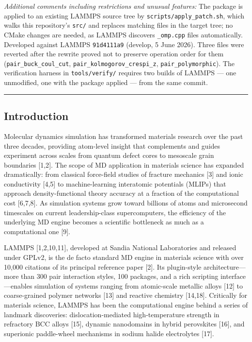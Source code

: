 \documentclass[
  11pt,
]{article}
\begin{document}
\emph{Additional comments including restrictions and unusual features:}
The package is applied to an existing LAMMPS source tree by
\texttt{scripts/apply\_patch.sh}, which walks this repository's
\texttt{src/} and replaces matching files in the target tree; no CMake
changes are needed, as LAMMPS discovers \texttt{\_omp.cpp} files
automatically. Developed against LAMMPS \texttt{91d4111a9} (develop, 5
June 2026). Three files were reverted after the rewrite proved not to
preserve operation order for them (\texttt{pair\_buck\_coul\_cut},
\texttt{pair\_kolmogorov\_crespi\_z}, \texttt{pair\_polymorphic}). The
verification harness in \texttt{tools/verify/} requires two builds of
LAMMPS --- one unmodified, one with the package applied --- from the
same commit.

\begin{center}\rule{0.5\linewidth}{0.5pt}\end{center}

\subsection{Introduction}\label{introduction}

Molecular dynamics simulation has transformed materials research over
the past three decades, providing atom-level insight that complements
and guides experiment across scales from quantum defect cores to
mesoscale grain boundaries {[}1,2{]}. The scope of MD application in
materials science has expanded dramatically: from classical force-field
studies of fracture mechanics {[}3{]} and ionic conductivity {[}4,5{]}
to machine-learning interatomic potentials (MLIPs) that approach
density-functional theory accuracy at a fraction of the computational
cost {[}6,7,8{]}. As simulation systems grow toward billions of atoms
and microsecond timescales on current leadership-class supercomputers,
the efficiency of the underlying MD engine becomes a scientific
bottleneck as much as a computational one {[}9{]}.

LAMMPS {[}1,2,10,11{]}, developed at Sandia National Laboratories and
released under GPLv2, is the de facto standard MD engine in materials
science with over 10,000 citations of its principal reference paper
{[}2{]}. Its plugin-style architecture---more than 300 pair interaction
styles, 100 packages, and a rich scripting interface---enables
simulation of systems ranging from atomic-scale metallic alloys {[}12{]}
to coarse-grained polymer networks {[}13{]} and reactive chemistry
{[}14,18{]}. Critically for materials science, LAMMPS has been the
computational engine behind a series of landmark discoveries:
dislocation-mediated high-temperature strength in refractory BCC alloys
{[}15{]}, dynamic nanodomains in hybrid perovskites {[}16{]}, and
superionic paddle-wheel mechanisms in sodium halide electrolytes
{[}17{]}.
\end{document}
